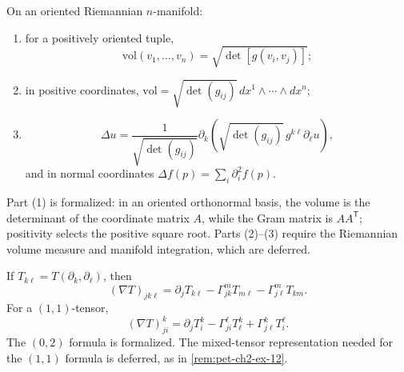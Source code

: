 \begin{remark}
  \label{rem:pet-ch2-ex-23}
  \leanok
  On an oriented Riemannian $n$-manifold:
  \begin{enumerate}
    \item for a positively oriented tuple,
      \[
        \mathrm{vol}(v_1,\dots,v_n)
          =\sqrt{\det[g(v_i,v_j)]};
      \]
    \item in positive coordinates,
      $\mathrm{vol}=\sqrt{\det(g_{ij})}\,
        dx^1\wedge\cdots\wedge dx^n$;
    \item
      \[
        \Delta u
          =\frac1{\sqrt{\det(g_{ij})}}
             \partial_k\!\left(
               \sqrt{\det(g_{ij})}\,g^{k\ell}\partial_\ell u\right),
      \]
      and in normal coordinates
      $\Delta f(p)=\sum_i\partial_i^2f(p)$.
  \end{enumerate}
  \sketch
  Part (1) is formalized: in an oriented orthonormal basis, the volume is the
  determinant of the coordinate matrix $A$, while the Gram matrix is
  $AA^{\mathsf T}$; positivity selects the positive square root. Parts
  (2)--(3) require the Riemannian volume measure and manifold integration,
  which are deferred.
\end{remark}

\begin{remark}
  \label{rem:pet-ch2-ex-24}
  \leanok
  If
  $T_{k\ell}=T(\partial_k,\partial_\ell)$, then
  \[
    (\nabla T)_{jk\ell}
      =\partial_jT_{k\ell}
       -\Gamma^m_{jk}T_{m\ell}
       -\Gamma^m_{j\ell}T_{km}.
  \]
  For a $(1,1)$-tensor,
  \[
    (\nabla T)^k_{ji}
      =\partial_jT^k_i-\Gamma^\ell_{ji}T^k_\ell
       +\Gamma^k_{j\ell}T^\ell_i.
  \]
  The $(0,2)$ formula is formalized. The mixed-tensor representation needed
  for the $(1,1)$ formula is deferred, as in \cref{rem:pet-ch2-ex-12}.
\end{remark}

